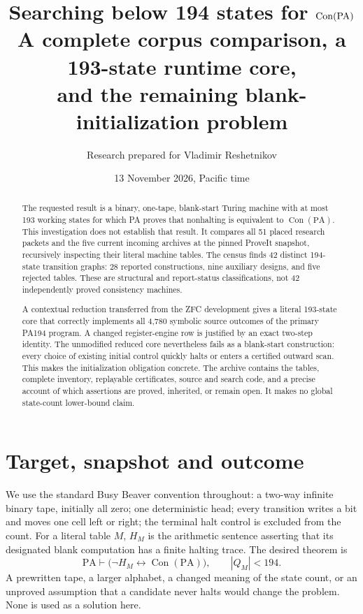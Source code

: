 \documentclass[11pt,letterpaper]{article}
\title{Searching below 194 states for $\Con(\PA)$\\[4pt]\large A complete corpus comparison, a 193-state runtime core,\\and the remaining blank-initialization problem}
\author{Research prepared for Vladimir Reshetnikov}
\date{13 November 2026, Pacific time}
\newcommand{\PA}{\mathrm{PA}}
\newcommand{\Con}{\operatorname{Con}}
\begin{document}
\maketitle
\begin{abstract}
The requested result is a binary, one-tape, blank-start Turing machine with
at most 193 working states for which PA proves that nonhalting is equivalent
to $\Con(\PA)$. This investigation does not establish that result.
It compares all 51 placed research packets and the five current incoming
archives at the pinned ProveIt snapshot, recursively inspecting their literal
machine tables. The census finds 42 distinct 194-state transition graphs:
28 reported constructions, nine auxiliary designs, and five rejected tables.
These are structural and report-status classifications, not 42 independently
proved consistency machines.

A contextual reduction transferred from the ZFC development gives a literal
193-state core that correctly implements all 4,780 symbolic source outcomes
of the primary PA194 program. A changed register-engine row is justified by
an exact two-step identity. The unmodified reduced core nevertheless fails
as a blank-start construction: every choice of existing initial control
quickly halts or enters a certified outward scan. This makes the initialization
obligation concrete. The archive contains the tables, complete inventory,
replayable certificates, source and search code, and a precise account of
which assertions are proved, inherited, or remain open. It makes no global
state-count lower-bound claim.
\end{abstract}
\tableofcontents
\newpage

\section{Target, snapshot and outcome}

We use the standard Busy Beaver convention throughout: a two-way infinite
binary tape, initially all zero; one deterministic head; every transition
writes a bit and moves one cell left or right; the terminal halt control
is excluded from the count. For a literal table $M$, $H_M$ is the arithmetic
sentence asserting that its designated blank computation has a finite
halting trace. The desired theorem is
\[
  \PA\vdash \bigl(\neg H_M\leftrightarrow\Con(\PA)\bigr),
  \qquad |Q_M|<194.
\]
A prewritten tape, a larger alphabet, a changed meaning of the state count,
or an unproved assumption that a candidate never halts would change the
problem. None is used as a solution here.
\end{document}

